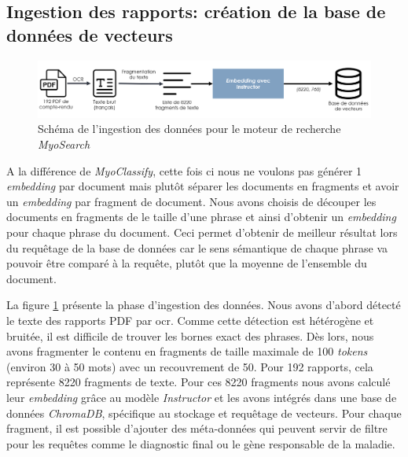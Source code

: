 \subsection{Ingestion des rapports: création de la base de données de vecteurs}
\begin{figure}[!ht]
 \centering
 \includegraphics[width=1\textwidth]{figures/myosearch_ingest.png}
 \caption[Ingestion des données dans \textit{MyoSearch}]{Schéma de l'ingestion des données pour le moteur de recherche \textit{MyoSearch}}
 \label{fig:myosearch_ingest}
\end{figure}

A la différence de \textit{MyoClassify}, cette fois ci nous ne voulons pas générer 1 \textit{embedding} par document mais plutôt séparer les documents en fragments et avoir un \textit{embedding} par fragment de document. Nous avons choisis de découper les documents en fragments de le taille d'une phrase et ainsi d'obtenir un \textit{embedding} pour chaque phrase du document. Ceci permet d'obtenir de meilleur résultat lors du requêtage de la base de données car le sens sémantique de chaque phrase va pouvoir être comparé à la requête, plutôt que la moyenne de l'ensemble du document.

La figure \ref{fig:myosearch_ingest} présente la phase d'ingestion des données. Nous avons d'abord détecté le texte des rapports PDF par \gls{ocr}. Comme cette détection est hétérogène et bruitée, il est difficile de trouver les bornes exact des phrases. Dès lors, nous avons fragmenter le contenu en fragments de taille maximale de 100 \textit{tokens} (environ 30 à 50 mots) avec un recouvrement de 50. Pour 192 rapports, cela représente 8220 fragments de texte. Pour ces 8220 fragments nous avons calculé leur \textit{embedding} grâce au modèle \textit{Instructor} et les avons intégrés dans une base de données \textit{ChromaDB}, spécifique au stockage et requêtage de vecteurs. Pour chaque fragment, il est possible d'ajouter des méta-données qui peuvent servir de filtre pour les requêtes comme le diagnostic final ou le gène responsable de la maladie.

